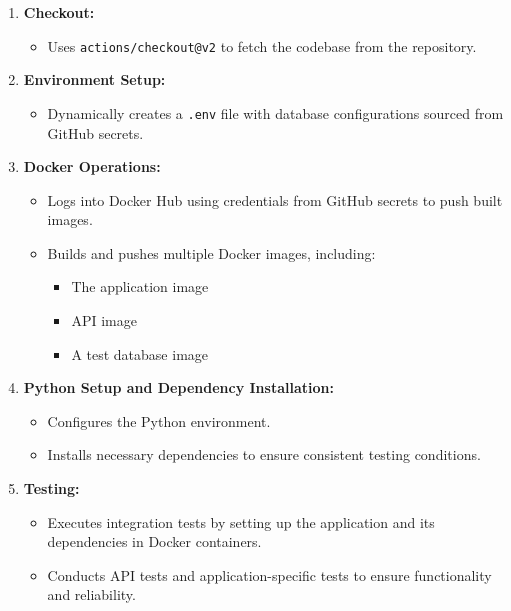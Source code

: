 \documentclass[12pt, a4paper, oneside]{book}
\begin{document}
\begin{spacing}{1.5}
\begin{enumerate}
    \item \textbf{Checkout:} 
    \begin{itemize}
        \item Uses \texttt{actions/checkout@v2} to fetch the codebase from the repository.
    \end{itemize}
    
    \item \textbf{Environment Setup:} 
    \begin{itemize}
        \item Dynamically creates a \texttt{.env} file with database configurations sourced from GitHub secrets.
    \end{itemize}
    
    \item \textbf{Docker Operations:}
    \begin{itemize}
        \item Logs into Docker Hub using credentials from GitHub secrets to push built images.
        \item Builds and pushes multiple Docker images, including:
        \begin{itemize}
            \item The application image
            \item API image
            \item A test database image
        \end{itemize}
    \end{itemize}
    
    \item \textbf{Python Setup and Dependency Installation:}
    \begin{itemize}
        \item Configures the Python environment.
        \item Installs necessary dependencies to ensure consistent testing conditions.
    \end{itemize}
    
    \item \textbf{Testing:}
    \begin{itemize}
        \item Executes integration tests by setting up the application and its dependencies in Docker containers.
        \item Conducts API tests and application-specific tests to ensure functionality and reliability.
    \end{itemize}
\end{enumerate}


\end{spacing}
\end{document}
